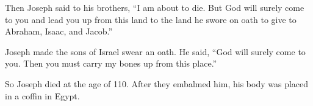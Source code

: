 \begin{scripture}
 Then Joseph said to his brothers, ``I am about to die. But God will surely come to you and lead you up from this land to the land he swore on oath to give to Abraham, Isaac, and Jacob.''
 Joseph made the sons of Israel swear an oath. He said, ``God will surely come to you. Then you must carry my bones up from this place.''
 So Joseph died at the age of 110. After they embalmed him, his body was placed in a coffin in Egypt.

\end{scripture}
